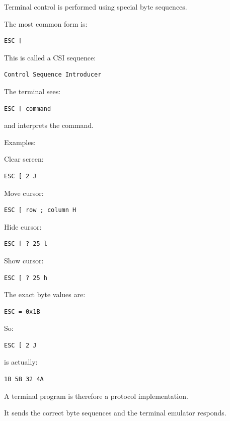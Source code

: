 \documentclass[
  oneside,
  openany]{book}
\begin{document}
Terminal control is performed using special byte sequences.

The most common form is:

\begin{verbatim}
ESC [
\end{verbatim}

This is called a CSI sequence:

\begin{verbatim}
Control Sequence Introducer
\end{verbatim}

The terminal sees:

\begin{verbatim}
ESC [ command
\end{verbatim}

and interprets the command.

Examples:

Clear screen:

\begin{verbatim}
ESC [ 2 J
\end{verbatim}

Move cursor:

\begin{verbatim}
ESC [ row ; column H
\end{verbatim}

Hide cursor:

\begin{verbatim}
ESC [ ? 25 l
\end{verbatim}

Show cursor:

\begin{verbatim}
ESC [ ? 25 h
\end{verbatim}

The exact byte values are:

\begin{verbatim}
ESC = 0x1B
\end{verbatim}

So:

\begin{verbatim}
ESC [ 2 J
\end{verbatim}

is actually:

\begin{verbatim}
1B 5B 32 4A
\end{verbatim}

A terminal program is therefore a protocol implementation.

It sends the correct byte sequences and the terminal emulator responds.
\end{document}

